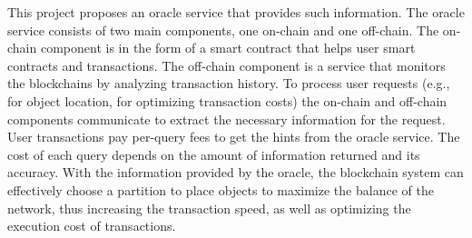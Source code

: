 This project proposes an oracle service that provides such information. The
oracle service consists of two main components, one on-chain and one off-chain.
The on-chain component is in the form of a smart contract that helps user smart 
contracts and transactions.
The off-chain component is a service that
monitors the blockchains by analyzing transaction history. To process
user requests (e.g., for object location, for optimizing transaction costs) the on-chain and off-chain components
communicate to extract the necessary information for the request. User transactions 
pay per-query fees to get the hints from the oracle service. The cost
of each query depends on the amount of information returned and its accuracy. With the
information provided by the oracle, the blockchain system can effectively choose
a partition to place objects to maximize the balance of the network, thus
increasing the transaction speed, as well as optimizing the execution cost
of transactions.



